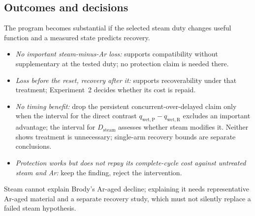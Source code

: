 \subsection{Outcomes and decisions}

The program becomes substantial if the selected steam duty changes useful function and a measured state predicts recovery.
\begin{itemize}
\item \emph{No important steam-minus-Ar loss:} supports compatibility without supplementary \COtwo{} at the tested duty; no protection claim is needed there.
\item \emph{Loss before the reset, recovery after it:} supports recoverability under that treatment; Experiment~2 decides whether its cost is repaid.
\item \emph{No timing benefit:} drop the persistent concurrent-over-delayed claim only when the interval for the direct contrast $q_{\mathrm{wet,P}}-q_{\mathrm{wet,R}}$ excludes an important advantage; the interval for $D_{\mathrm{steam}}$ assesses whether steam modifies it. Neither shows \COtwo{} treatment is unnecessary; single-arm recovery bounds are separate conclusions.
\item \emph{Protection works but does not repay its complete-cycle cost against untreated steam and Ar:} keep the finding, reject the intervention.
\end{itemize}
Steam cannot explain Brody's Ar-aged decline; explaining it needs representative Ar-aged material and a separate recovery study, which must not silently replace a failed steam hypothesis.
